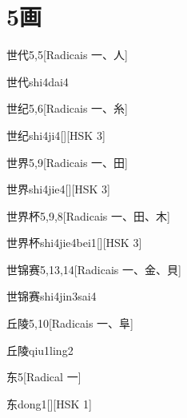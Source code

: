 
\section*{5画}

\begin{entry}{世代}{5,5}[Radicais ⼀、⼈]
  \begin{phonetics}{世代}{shi4dai4}
  \end{phonetics}
\end{entry}

\begin{entry}{世纪}{5,6}[Radicais ⼀、⽷]
  \begin{phonetics}{世纪}{shi4ji4}[][HSK 3]
  \end{phonetics}
\end{entry}

\begin{entry}{世界}{5,9}[Radicais ⼀、⽥]
  \begin{phonetics}{世界}{shi4jie4}[][HSK 3]
  \end{phonetics}
\end{entry}

\begin{entry}{世界杯}{5,9,8}[Radicais ⼀、⽥、⽊]
  \begin{phonetics}{世界杯}{shi4jie4bei1}[][HSK 3]
  \end{phonetics}
\end{entry}

\begin{entry}{世锦赛}{5,13,14}[Radicais ⼀、⾦、⾙]
  \begin{phonetics}{世锦赛}{shi4jin3sai4}
  \end{phonetics}
\end{entry}

\begin{entry}{丘陵}{5,10}[Radicais ⼀、⾩]
  \begin{phonetics}{丘陵}{qiu1ling2}
  \end{phonetics}
\end{entry}

\begin{entry}{东}{5}[Radical ⼀]
  \begin{phonetics}{东}{dong1}[][HSK 1]
  \end{phonetics}
\end{entry}

